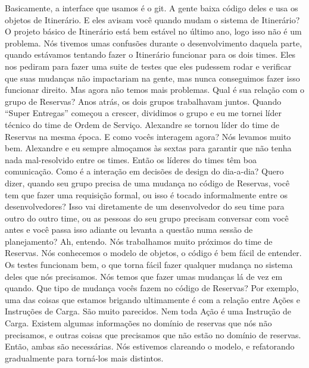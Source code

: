 \documentclass[12pt,play]{article}
\begin{document}
\julian Basicamente, a interface que usamos é o git. A gente baixa código deles e usa os objetos de Itinerário.
\dani E eles avisam você quando mudam o sistema de Itinerário?
\julian O projeto básico de Itinerário está bem estável no último ano, logo isso não é um problema. Nós tivemos umas confusões durante o desenvolvimento daquela parte, quando estávamos tentando fazer o Itinerário funcionar para os dois times. Eles nos pediram para fazer uma suite de testes que eles pudessem rodar e verificar que suas mudanças não impactariam na gente, mas nunca conseguimos fazer isso funcionar direito. Mas agora não temos mais problemas.
\dani Qual é sua relação com o grupo de Reservas?
\julian Anos atrás, os dois grupos trabalhavam juntos. Quando ``Super Entregas'' começou a crescer, dividimos o grupo e eu me tornei líder técnico do time de Ordem de Serviço. Alexandre se tornou líder do time de Reservas na mesma época.
\dani E como vocês interagem agora?
\julian Nós levamos muito bem. Alexandre e eu sempre almoçamos às sextas para garantir que não tenha nada mal-resolvido entre os times.
\dani Então os líderes do times têm boa comunicação. Como é a interação em decisões de design do dia-a-dia? Quero dizer, quando seu grupo precisa de uma mudança no código de Reservas, você tem que fazer uma requisição formal, ou isso é tocado informalmente entre os desenvolvedores? Isso vai diretamente de um desenvolvedor do seu time para outro do outro time, ou as pessoas do seu grupo precisam conversar com você antes e você passa isso adiante ou levanta a questão numa sessão de planejamento?
\julian Ah, entendo. Nós trabalhamos muito próximos do time de Reservas. Nós conhecemos o modelo de objetos, o código é bem fácil de entender. Os testes funcionam bem, o que torna fácil fazer qualquer mudança no sistema deles que nós precisamos. Nós temos que fazer umas mudanças lá de vez em quando.
\dani Que tipo de mudança vocês fazem no código de Reservas?
\julian Por exemplo, uma das coisas que estamos brigando ultimamente é com a relação entre Ações e Instruções de Carga. São muito parecidos. Nem toda Ação é uma Instrução de Carga. Existem algumas informações no domínio de reservas que nós não precisamos, e outras coisas que precisamos que não estão no domínio de reservas. Então, ambas são necessárias. Nós estivemos clareando o modelo, e refatorando gradualmente para torná-los mais distintos.

\narr {}
\end{document}

